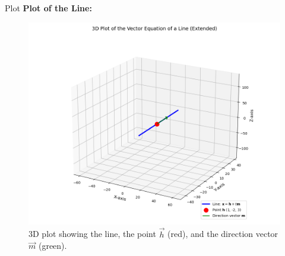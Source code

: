 \documentclass{beamer}
\begin{document}
\begin{frame}{Plot}
\centering
\textbf{Plot of the Line:}
\begin{figure}[h!]
    \centering
    \includegraphics[width=0.8\columnwidth]{figs/fig1.png}
    \caption{3D plot showing the line, the point $\vec{h}$ (red), and the direction vector $\vec{m}$ (green).}
\end{figure}
\end{frame}
\end{document}
